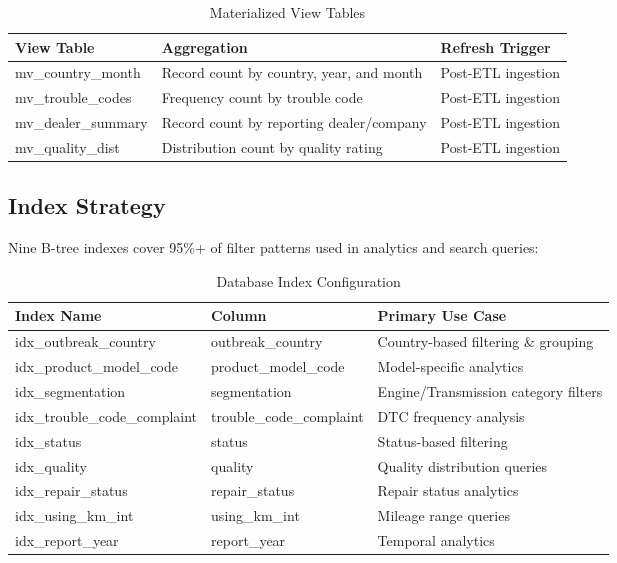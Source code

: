 \documentclass[12pt, a4paper, twoside]{article}
\begin{document}
\begin{table}[H]
\centering
\caption{Materialized View Tables}
\label{tab:mv}
\begin{tabularx}{\textwidth}{L{3cm} X L{3cm}}
\toprule
{}\color{white}\textbf{View Table} & \color{white}\textbf{Aggregation} & \color{white}\textbf{Refresh Trigger} \\
\midrule
mv\_country\_month & Record count by country, year, and month & Post-ETL ingestion \\
mv\_trouble\_codes & Frequency count by trouble code & Post-ETL ingestion \\
mv\_dealer\_summary & Record count by reporting dealer/company & Post-ETL ingestion \\
mv\_quality\_dist & Distribution count by quality rating & Post-ETL ingestion \\
\bottomrule
\end{tabularx}
\end{table}

\subsection{Index Strategy}

Nine B-tree indexes cover 95\%+ of filter patterns used in analytics and search queries:

\begin{table}[H]
\centering
\caption{Database Index Configuration}
\label{tab:indexes}
\begin{tabularx}{\textwidth}{L{4cm} L{3.5cm} X}
\toprule
{}\color{white}\textbf{Index Name} & \color{white}\textbf{Column} & \color{white}\textbf{Primary Use Case} \\
\midrule
idx\_outbreak\_country & outbreak\_country & Country-based filtering \& grouping \\
idx\_product\_model\_code & product\_model\_code & Model-specific analytics \\
idx\_segmentation & segmentation & Engine/Transmission category filters \\
idx\_trouble\_code\_complaint & trouble\_code\_complaint & DTC frequency analysis \\
idx\_status & status & Status-based filtering \\
idx\_quality & quality & Quality distribution queries \\
idx\_repair\_status & repair\_status & Repair status analytics \\
idx\_using\_km\_int & using\_km\_int & Mileage range queries \\
idx\_report\_year & report\_year & Temporal analytics \\
\bottomrule
\end{tabularx}
\end{table}
\end{document}
